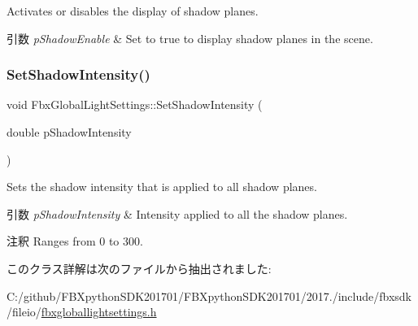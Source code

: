 Activates or disables the display of shadow planes. 
\begin{DoxyParams}{引数}
{\em p\+Shadow\+Enable} & Set to {\ttfamily true} to display shadow planes in the scene. \\
\hline
\end{DoxyParams}
\mbox{\label{class_fbx_global_light_settings_a6835a1d9ee52474a1c5c52dc855a1ba9}} 
\subsubsection{\texorpdfstring{Set\+Shadow\+Intensity()}{SetShadowIntensity()}}
{\footnotesize\ttfamily void Fbx\+Global\+Light\+Settings\+::\+Set\+Shadow\+Intensity (\begin{DoxyParamCaption}\item[{double}]{p\+Shadow\+Intensity }\end{DoxyParamCaption})}

Sets the shadow intensity that is applied to all shadow planes. 
\begin{DoxyParams}{引数}
{\em p\+Shadow\+Intensity} & Intensity applied to all the shadow planes. \\
\hline
\end{DoxyParams}
\begin{DoxyRemark}{注釈}
Ranges from 0 to 300. 
\end{DoxyRemark}


このクラス詳解は次のファイルから抽出されました\+:\begin{DoxyCompactItemize}
\item 
C\+:/github/\+F\+B\+Xpython\+S\+D\+K201701/\+F\+B\+Xpython\+S\+D\+K201701/2017./include/fbxsdk/fileio/\hyperlink{fbxgloballightsettings_8h}{fbxgloballightsettings.\+h}\end{DoxyCompactItemize}
